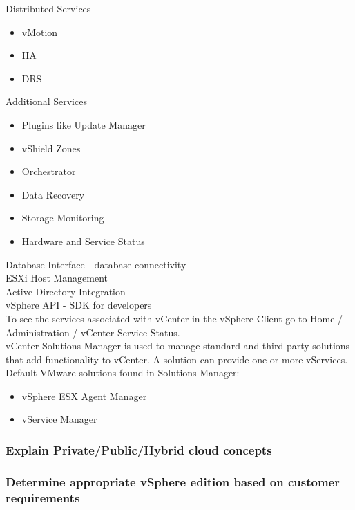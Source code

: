 Distributed Services

\begin{itemize}
\item vMotion
\item HA
\item DRS
\end{itemize}

Additional Services

\begin{itemize}
\item Plugins like Update Manager
\item vShield Zones
\item Orchestrator
\item Data Recovery
\item Storage Monitoring
\item Hardware and Service Status
\end{itemize}

Database Interface - database connectivity\\

ESXi Host Management\\

Active Directory Integration\\

vSphere API - SDK for developers\\

To see the services associated with vCenter in the vSphere Client go to
Home / Administration / vCenter Service Status.\\

vCenter Solutions Manager is used to manage standard and third-party solutions
that add functionality to vCenter. A solution can provide one or more
vServices.\\

Default VMware solutions found in Solutions Manager:

\begin{itemize}
\item vSphere ESX Agent Manager
\item vService Manager
\end{itemize}

\subsubsection{Explain Private/Public/Hybrid cloud concepts}

\subsubsection{Determine appropriate vSphere edition based on customer requirements}
